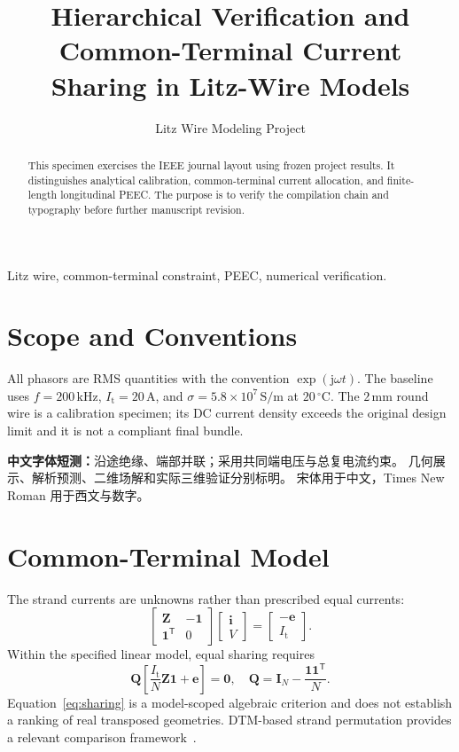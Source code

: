 \documentclass[journal,10pt]{IEEEtran}
\title{Hierarchical Verification and Common-Terminal Current Sharing in Litz-Wire Models}
\author{Litz Wire Modeling Project}
\begin{document}
\maketitle
\begin{abstract}
This specimen exercises the IEEE journal layout using frozen project results.
It distinguishes analytical calibration, common-terminal current allocation,
and finite-length longitudinal PEEC. The purpose is to verify the compilation
chain and typography before further manuscript revision.
\end{abstract}
\begin{IEEEkeywords}
Litz wire, common-terminal constraint, PEEC, numerical verification.
\end{IEEEkeywords}
\section{Scope and Conventions}
All phasors are RMS quantities with the convention $\exp(\mathrm{j}\omega t)$.
The baseline uses $f=200\,\mathrm{kHz}$, $I_{\mathrm{t}}=20\,\mathrm{A}$,
and $\sigma=5.8\times10^7\,\mathrm{S/m}$ at $20\,{}^{\circ}\mathrm{C}$.
The $2\,\mathrm{mm}$ round wire is a calibration specimen; its DC current
density exceeds the original design limit and it is not a compliant final bundle.

\textbf{中文字体短测：}沿途绝缘、端部并联；采用共同端电压与总复电流约束。
几何展示、解析预测、二维场解和实际三维验证分别标明。
宋体用于中文，Times New Roman 用于西文与数字。

\section{Common-Terminal Model}
The strand currents are unknowns rather than prescribed equal currents:
\begin{equation}
\begin{bmatrix}\mathbf Z&-\mathbf1\\\mathbf1^{\mathsf T}&0\end{bmatrix}
\begin{bmatrix}\mathbf i\\V\end{bmatrix}
=\begin{bmatrix}-\mathbf e\\I_{\mathrm t}\end{bmatrix}.
\label{eq:common}
\end{equation}
Within the specified linear model, equal sharing requires
\begin{equation}
\mathbf Q\left[\frac{I_{\mathrm t}}{N}\mathbf Z\mathbf1+\mathbf e\right]
=\mathbf0,\quad
\mathbf Q=\mathbf I_N-\frac{\mathbf1\mathbf1^{\mathsf T}}N.
\label{eq:sharing}
\end{equation}
Equation~\eqref{eq:sharing} is a model-scoped algebraic criterion and does not
establish a ranking of real transposed geometries. DTM-based strand permutation
provides a relevant comparison framework~\cite{cruciani2023}.
\end{document}

